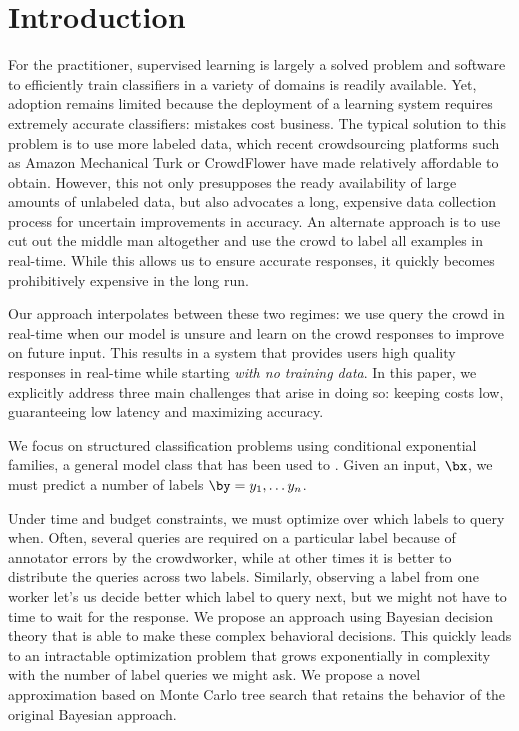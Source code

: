 \section{Introduction}

For the practitioner, supervised learning is largely a solved problem and software to efficiently train classifiers in a variety of domains is readily available.
Yet, adoption remains limited because the deployment of a learning system requires extremely accurate classifiers: mistakes cost business.
The typical solution to this problem is to use more labeled data, which recent crowdsourcing platforms such as Amazon Mechanical Turk or CrowdFlower have made relatively affordable to obtain.
However, this not only presupposes the ready availability of large amounts of unlabeled data, but also advocates a long, expensive data collection process for uncertain improvements in accuracy.
An alternate approach is to use cut out the middle man altogether and use the crowd to label all examples in real-time\cite{cheng2015flock}. 
While this allows us to ensure accurate responses, it quickly becomes prohibitively expensive in the long run. 

Our approach interpolates between these two regimes: we use query the crowd in real-time when our model is unsure and learn on the crowd responses to improve on future input.
This results in a system that provides users high quality responses in real-time while starting {\em with no training data}.
In this paper, we explicitly address three main challenges that arise in doing so: keeping costs low, guaranteeing low latency and maximizing accuracy.

We focus on structured classification problems using conditional exponential families, a general model class that has been used to .
Given an input, $\bx$, we must predict a number of labels $\by = y_1, \ldots y_n$.

Under time and budget constraints, we must optimize over which labels to query when. 
Often, several queries are required on a particular label because of annotator errors by the crowdworker, while at other times it is better to distribute the queries across two labels.
Similarly, observing a label from one worker let's us decide better which label to query next, but we might not have to time to wait for the response.
We propose an approach using Bayesian decision theory that is able to make these complex behavioral decisions.
This quickly leads to an intractable optimization problem that grows exponentially in complexity with the number of label queries we might ask.
We propose a novel approximation based on Monte Carlo tree search that retains the behavior of the original Bayesian approach.

